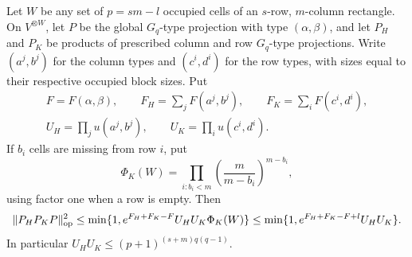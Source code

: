 \begin{theorem}
\label{thm:one-sided-type-angle}
Let $W$ be any set of $p=sm-l$ occupied cells of an $s$-row,
$m$-column rectangle. On $V^{\otimes W}$, let $P$ be the global
$G_q$-type projection with type $(\alpha,\beta)$, and let $P_H$ and
$P_K$ be products of prescribed column and row $G_q$-type projections.
Write $(a^j,b^j)$ for the column types and $(c^i,d^i)$ for the row
types, with sizes equal to their respective occupied block sizes.
Put
\[
 \begin{gathered}
 F=F(\alpha,\beta),\qquad F_H=\sum_jF(a^j,b^j),\qquad
 F_K=\sum_iF(c^i,d^i),\\
 U_H=\prod_ju(a^j,b^j),\qquad U_K=\prod_iu(c^i,d^i).
 \end{gathered}
\]
If $b_i$ cells are missing from row $i$, put
\[
 \Phi_K(W)=\prod_{i:b_i<m}
       \left(\frac m{m-b_i}\right)^{m-b_i},
\]
using factor one when a row is empty. Then
\begin{equation}
 \|P_H P_KP\|_{\rm op}^2
 \le\min\{1,e^{F_H+F_K-F}U_HU_K\Phi_K(W)\}
 \le\min\{1,e^{F_H+F_K-F+l}U_HU_K\}.
 \label{eq:one-sided-type-angle-exact}
\end{equation}
In particular $U_HU_K\le(p+1)^{(s+m)q(q-1)}$.
\end{theorem}
